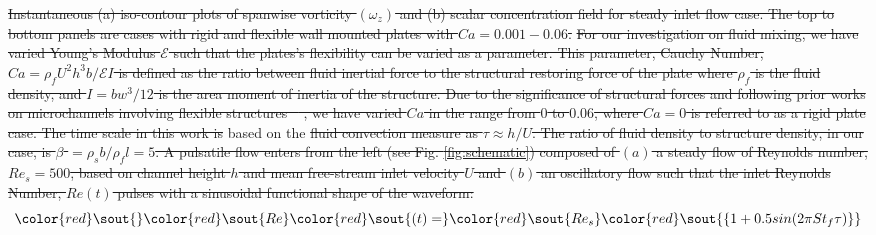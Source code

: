 \documentclass[%
aip,
amsmath,amssymb,
reprint,
]{revtex4-1}
\providecommand{\DIFadd}[1]{{\protect\color{blue}\uwave{#1}}} %
\providecommand{\DIFdel}[1]{{\protect\color{red}\sout{#1}}}                      %
\providecommand{\DIFaddbegin}{} %
\providecommand{\DIFaddend}{} %
\providecommand{\DIFdelbegin}{} %
\providecommand{\DIFdelend}{} %
\providecommand{\DIFdelFL}[1]{\DIFdel{#1}} %
\newcommand{\DIFscaledelfig}{0.5}
\newlength{\DIFdelgraphicswidth} %
\newlength{\DIFdelgraphicsheight} %
\newcommand{\DIFaddincludegraphics}[2][]{{\color{blue}\fbox{\DIFOincludegraphics[#1]{#2}}}} %
\newcommand{\DIFdelincludegraphics}[2][]{%
\sbox{\DIFdelgraphicsbox}{\DIFOincludegraphics[#1]{#2}}%
\settoboxwidth{\DIFdelgraphicswidth}{\DIFdelgraphicsbox} %
\settoboxtotalheight{\DIFdelgraphicsheight}{\DIFdelgraphicsbox} %
\scalebox{\DIFscaledelfig}{%
\parbox[b]{\DIFdelgraphicswidth}{\usebox{\DIFdelgraphicsbox}\\[-\baselineskip] \rule{\DIFdelgraphicswidth}{0em}}\llap{\resizebox{\DIFdelgraphicswidth}{\DIFdelgraphicsheight}{%
\setlength{\unitlength}{\DIFdelgraphicswidth}%
\begin{picture}(1,1)%
\thicklines\linethickness{2pt} %
{\color[rgb]{1,0,0}\put(0,0){\framebox(1,1){}}}%
{\color[rgb]{1,0,0}\put(0,0){\line( 1,1){1}}}%
{\color[rgb]{1,0,0}\put(0,1){\line(1,-1){1}}}%
\end{picture}%
}\hspace*{3pt}}} %
} %
\DeclareRobustCommand{\DIFaddbegin}{\DIFOaddbegin \let\includegraphics\DIFaddincludegraphics} %
\DeclareRobustCommand{\DIFaddend}{\DIFOaddend \let\includegraphics\DIFOincludegraphics} %
\DeclareRobustCommand{\DIFdelbegin}{\DIFOdelbegin \let\includegraphics\DIFdelincludegraphics} %
\DeclareRobustCommand{\DIFdelend}{\DIFOaddend \let\includegraphics\DIFOincludegraphics} %
\begin{document}
{%
\DIFdelFL{Instantaneous (a) iso-contour plots of spanwise vorticity $(\omega_z)$ and (b) scalar concentration field for steady inlet flow case. The top to bottom panels are cases with rigid and flexible wall mounted plates with $Ca=0.001-0.06$.}}
\DIFdel{For our investigation on fluid mixing, we have varied Young's Modulus $\mathcal{E}$ such that the plates's flexibility can be varied as a parameter. This parameter, Cauchy Number, $Ca=\rho_f U^2 h^3 b/{\mathcal{E}I}$ is defined as the ratio between fluid inertial force to the structural restoring force of the plate where $\rho_f$ is the fluid density, and $I=bw^3/12$ is the area moment of inertia of the structure. Due to the significance of structural forces and following prior works on microchannels involving flexible structures \mbox{%
\citep{Vandenberghe2004}}\hspace{0pt}%
, we have varied $Ca$ in the range from $0$ to $0.06$, where $Ca=0$ is referred to as a rigid plate case. The time scale in this work is }\DIFdelend \DIFaddbegin \DIFadd{, ensuring that the Courant number, }\DIFaddend based on the \DIFdelbegin \DIFdel{fluid convection measure as $\tau \approx h/U$. The ratio of fluid density to structure density, in our case, is $\beta$ $=\rho_s b / \rho_f l = 5$. A pulsatile flow enters from the left (see Fig. \ref{fig:schematic}) composed of $(a)$ a steady flow of Reynolds number, $Re_{s} = 500$, based on channel height $h$ and mean free-stream inlet velocity $U$ and $(b)$ an oscillatory flow such that the inlet Reynolds Number, ${Re}(t)$ pulses with a sinusoidal functional shape of the waveform:
}\begin{displaymath}
	\DIFdel{\centering
	}{\DIFdel{Re}}\DIFdel{(t) = }{\DIFdel{Re_s}}\DIFdel{\{1+0.5sin(2\pi St_f \tau)\}
}\end{displaymath}%
\end{document}
